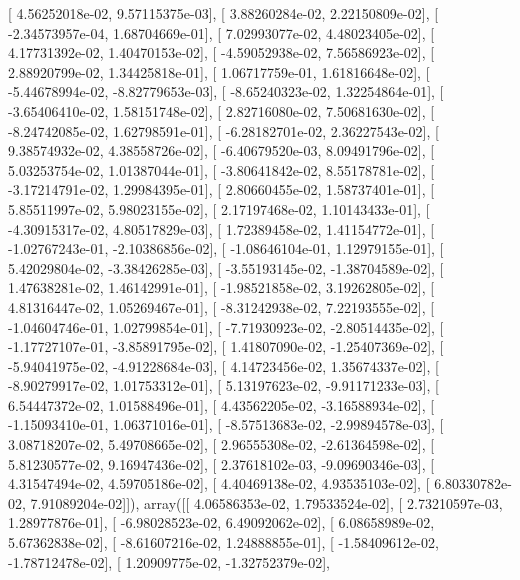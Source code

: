 \documentclass{article}
\begin{document}
       [  4.56252018e-02,   9.57115375e-03],
       [  3.88260284e-02,   2.22150809e-02],
       [ -2.34573957e-04,   1.68704669e-01],
       [  7.02993077e-02,   4.48023405e-02],
       [  4.17731392e-02,   1.40470153e-02],
       [ -4.59052938e-02,   7.56586923e-02],
       [  2.88920799e-02,   1.34425818e-01],
       [  1.06717759e-01,   1.61816648e-02],
       [ -5.44678994e-02,  -8.82779653e-03],
       [ -8.65240323e-02,   1.32254864e-01],
       [ -3.65406410e-02,   1.58151748e-02],
       [  2.82716080e-02,   7.50681630e-02],
       [ -8.24742085e-02,   1.62798591e-01],
       [ -6.28182701e-02,   2.36227543e-02],
       [  9.38574932e-02,   4.38558726e-02],
       [ -6.40679520e-03,   8.09491796e-02],
       [  5.03253754e-02,   1.01387044e-01],
       [ -3.80641842e-02,   8.55178781e-02],
       [ -3.17214791e-02,   1.29984395e-01],
       [  2.80660455e-02,   1.58737401e-01],
       [  5.85511997e-02,   5.98023155e-02],
       [  2.17197468e-02,   1.10143433e-01],
       [ -4.30915317e-02,   4.80517829e-03],
       [  1.72389458e-02,   1.41154772e-01],
       [ -1.02767243e-01,  -2.10386856e-02],
       [ -1.08646104e-01,   1.12979155e-01],
       [  5.42029804e-02,  -3.38426285e-03],
       [ -3.55193145e-02,  -1.38704589e-02],
       [  1.47638281e-02,   1.46142991e-01],
       [ -1.98521858e-02,   3.19262805e-02],
       [  4.81316447e-02,   1.05269467e-01],
       [ -8.31242938e-02,   7.22193555e-02],
       [ -1.04604746e-01,   1.02799854e-01],
       [ -7.71930923e-02,  -2.80514435e-02],
       [ -1.17727107e-01,  -3.85891795e-02],
       [  1.41807090e-02,  -1.25407369e-02],
       [ -5.94041975e-02,  -4.91228684e-03],
       [  4.14723456e-02,   1.35674337e-02],
       [ -8.90279917e-02,   1.01753312e-01],
       [  5.13197623e-02,  -9.91171233e-03],
       [  6.54447372e-02,   1.01588496e-01],
       [  4.43562205e-02,  -3.16588934e-02],
       [ -1.15093410e-01,   1.06371016e-01],
       [ -8.57513683e-02,  -2.99894578e-03],
       [  3.08718207e-02,   5.49708665e-02],
       [  2.96555308e-02,  -2.61364598e-02],
       [  5.81230577e-02,   9.16947436e-02],
       [  2.37618102e-03,  -9.09690346e-03],
       [  4.31547494e-02,   4.59705186e-02],
       [  4.40469138e-02,   4.93535103e-02],
       [  6.80330782e-02,   7.91089204e-02]]), array([[  4.06586353e-02,   1.79533524e-02],
       [  2.73210597e-03,   1.28977876e-01],
       [ -6.98028523e-02,   6.49092062e-02],
       [  6.08658989e-02,   5.67362838e-02],
       [ -8.61607216e-02,   1.24888855e-01],
       [ -1.58409612e-02,  -1.78712478e-02],
       [  1.20909775e-02,  -1.32752379e-02],
\end{document}
